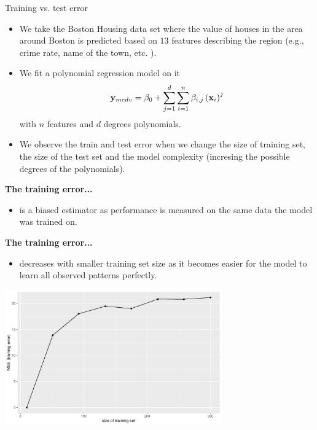 \begin{vbframe}{Training vs. test error}
\begin{small}
\begin{itemize}
\item We take the Boston Housing data set where the value of houses in the area around Boston is predicted based on $13$ features describing the region (e.g., crime rate, name of the town, etc. ).
\item We fit a polynomial regression model on it $$ \mathbf{y}_{medv} = \beta_0 + \sum_{j=1}^d \sum\limits_{i=1}^n \beta_{i, j} \left(\mathbf{x}_i\right)^j$$
with $n$ features and $d$ degrees polynomials.
\item We observe the train and test error when we change the size of training set, the size of the test set and the model complexity (incresing the possible degrees of the polynomials). 
\end{itemize}

\vfill

\textbf{The training error...}

\begin{itemize}
  \item is a biased estimator as performance is measured on the same data the 
  model was trained on.
\end{itemize}

\framebreak

\textbf{The training error...}
\begin{itemize}
  \item decreases with smaller training set size as it becomes easier for the 
  model to learn all observed patterns perfectly.
\end{itemize}
\end{small}
\begin{center}
\includegraphics[width=0.7\textwidth]{figure/fig-train-vs-test-error-1}
\end{center}

\framebreak


\end{vbframe}
